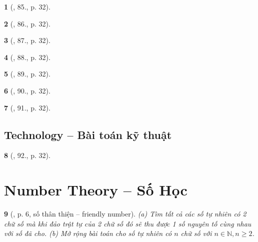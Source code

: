 \documentclass{article}
\newtheorem{baitoan}{}
\begin{document}
\begin{baitoan}[\cite{Doanh_Tuan_Pascal}, 85., p. 32]
	
\end{baitoan}

\begin{baitoan}[\cite{Doanh_Tuan_Pascal}, 86., p. 32]
	
\end{baitoan}

\begin{baitoan}[\cite{Doanh_Tuan_Pascal}, 87., p. 32]
	
\end{baitoan}

\begin{baitoan}[\cite{Doanh_Tuan_Pascal}, 88., p. 32]
	
\end{baitoan}

\begin{baitoan}[\cite{Doanh_Tuan_Pascal}, 89., p. 32]
	
\end{baitoan}

\begin{baitoan}[\cite{Doanh_Tuan_Pascal}, 90., p. 32]
	
\end{baitoan}

\begin{baitoan}[\cite{Doanh_Tuan_Pascal}, 91., p. 32]
	
\end{baitoan}


\subsection{Technology -- Bài toán kỹ thuật}

\begin{baitoan}[\cite{Doanh_Tuan_Pascal}, 92., p. 32]
	
\end{baitoan}


\section{Number Theory -- Số Học}

\begin{baitoan}[\cite{Huy_sang_tao_thuat_toan_lap_trinh_tap_1}, p. 6, số thân thiện -- friendly number]
	(a) Tìm tất cả các số tự nhiên có 2 chữ số mà khi đảo trật tự của 2 chữ số đó sẽ thu được 1 số nguyên tố cùng nhau với số đã cho. (b) Mở rộng bài toán cho số tự nhiên có $n$ chữ số với $n\in\mathbb{N},n\ge2$.
\end{baitoan}
\end{document}
